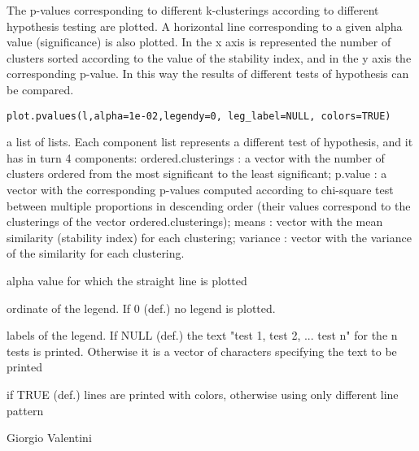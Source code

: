 \documentclass{article}
\begin{document}
\begin{Description}\relax
The p-values corresponding to different k-clusterings according to different hypothesis testing are plotted. A horizontal line corresponding to
a given alpha value (significance) is also plotted. In the x axis is represented the number of clusters sorted according to the value of the stability index,
and in the y axis the corresponding p-value.
In this way the results of different tests of hypothesis can be compared.
\end{Description}
\begin{Usage}
\begin{verbatim}
plot.pvalues(l,alpha=1e-02,legendy=0, leg_label=NULL, colors=TRUE)
\end{verbatim}
\end{Usage}
\begin{Arguments}
\begin{ldescription}
\item[\code{l}] a list of lists. Each component list represents a different test of hypothesis, and it has in turn 4 components:              
ordered.clusterings : a vector with the number of clusters ordered from the most significant to the least significant;
p.value : a vector with the corresponding p-values computed according to chi-square test between multiple proportions
in descending order (their values correspond to the clusterings of the vector ordered.clusterings);
means : vector with the mean similarity (stability index) for each clustering;
variance : vector with the variance of the similarity for each clustering.
\item[\code{alpha}] alpha value for which the straight line is plotted 
\item[\code{legendy}] ordinate of the legend. If 0 (def.) no legend is plotted. 
\item[\code{leg\_label}] labels of the legend. If NULL (def.) the text "test 1, test 2, ... test n" for the n tests is printed.
Otherwise it is a vector of characters specifying the text to be printed
\item[\code{colors}] if TRUE (def.) lines are printed with colors, otherwise using only different line pattern
\end{ldescription}
\end{Arguments}
\begin{Author}\relax
Giorgio Valentini 
\end{Author}
\end{document}
